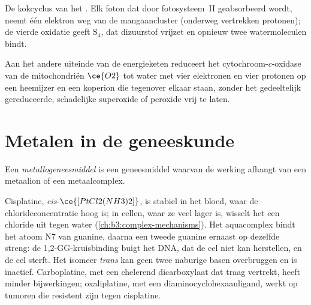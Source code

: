 \begin{omfigure}

{\small De kokcyclus van het . Elk foton dat
door fotosysteem~II geabsorbeerd wordt, neemt één elektron weg van de
mangaancluster (onderweg vertrekken protonen); de vierde oxidatie geeft $\mathrm S_4$, dat dizuurstof vrijzet en
opnieuw twee watermoleculen bindt.}
\end{omfigure}

Aan het andere uiteinde van de energieketen reduceert het
cytochroom-$c$-oxidase van de
mitochondriën $\ce{O2}$ tot water met vier elektronen en vier protonen op een
heemijzer en een koperion die tegenover elkaar staan, zonder het
gedeeltelijk gereduceerde, schadelijke superoxide of peroxide vrij te
laten.

\section{Metalen in de geneeskunde}

\begin{definition}[Metallogeneesmiddelen]\label{def:b3:bioinorganic:metallodrug}
Een \emph{metallogeneesmiddel} is een
geneesmiddel waarvan de werking afhangt van een metaalion of een
metaalcomplex.
\end{definition}

Cisplatine, \textit{cis}-$\ce{[PtCl2(NH3)2]}$, is stabiel in het bloed, waar de chlorideconcentratie
hoog is; in cellen, waar ze veel lager is, wisselt het een chloride uit
tegen water (\cref{ch:b3:complex-mechanisms}). Het aquacomplex bindt het
atoom N7 van guanine, daarna een tweede guanine ernaast op dezelfde
streng: de 1,2-GG-kruisbinding buigt het DNA, dat de cel niet kan
herstellen, en de cel sterft. Het isomeer
\textit{trans} kan geen twee naburige basen overbruggen en is inactief.
Carboplatine, met een chelerend dicarboxylaat dat traag vertrekt, heeft
minder bijwerkingen; oxaliplatine, met een diaminocyclohexaanligand,
werkt op tumoren die resistent zijn tegen cisplatine.

